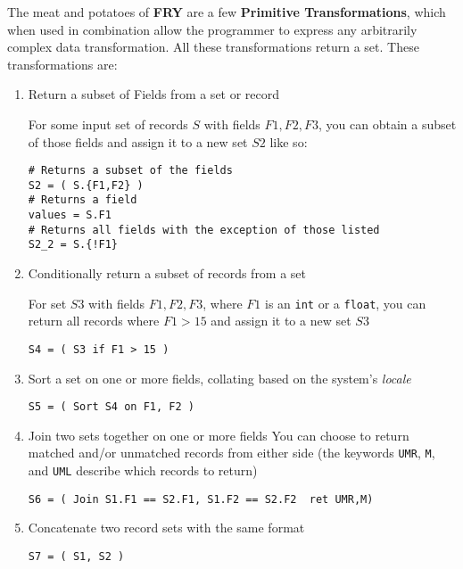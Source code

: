 \documentclass{article}
\begin{document}
The meat and potatoes of \textbf{FRY} are a few \textbf{Primitive Transformations}, which when used in combination allow the programmer to express any arbitrarily complex data transformation. All these transformations return a set. These transformations are:
\begin{enumerate}

\item Return a subset of Fields from a set or record

For some input set of records $S$ with fields $F1, F2, F3$, you can obtain a subset of those fields and assign it to a new set $S2$ like so:

\begin{lstlisting}
# Returns a subset of the fields
S2 = ( S.{F1,F2} )
# Returns a field
values = S.F1 
# Returns all fields with the exception of those listed
S2_2 = S.{!F1}
\end{lstlisting}

\item Conditionally return a subset of records from a set

For set $S3$ with fields $F1,F2,F3$, where $F1$ is an \texttt{int} or a \texttt{float}, you can return all records where $F1 > 15$ and assign it to a new set $S3$

\begin{lstlisting}
S4 = ( S3 if F1 > 15 )
\end{lstlisting}

\item Sort a set on one or more fields, collating based on the system's \emph{locale}

\begin{lstlisting}
S5 = ( Sort S4 on F1, F2 )
\end{lstlisting}

\item Join two sets together on one or more fields
You can choose to return matched and/or unmatched records from either side (the keywords \texttt{UMR}, \texttt{M}, and \texttt{UML} describe which records to return)

\begin{lstlisting}
S6 = ( Join S1.F1 == S2.F1, S1.F2 == S2.F2  ret UMR,M)
\end{lstlisting}

\item Concatenate two record sets with the same format

\begin{lstlisting}
S7 = ( S1, S2 )
\end{lstlisting}

\end{enumerate}
\end{document}
